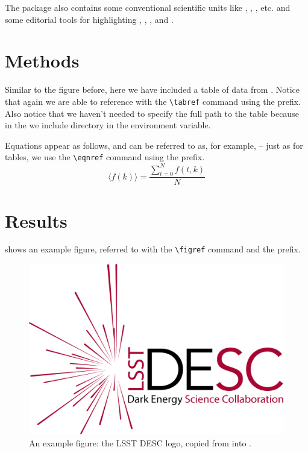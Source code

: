 \documentclass[\docopts]{\docclass}
\begin{document}
The  package also contains some conventional scientific units like \angstrom, \GeV, \Msun, etc. and some editorial tools for highlighting , , , and .



\section{Methods}
\label{sec:methods}

Similar to the figure before, here we have included a table of data from .
Notice that again we are able to reference  with the \verb=\tabref= command using the  prefix.
Also notice that we haven't needed to specify the full path to the table because in the  we include  directory in the  environment variable.



Equations appear as follows, and can be referred to as, for example,  -- just as for tables, we use the \verb=\eqnref= command using the  prefix.
\begin{equation}
  \label{eqn:example}
  \langle f(k) \rangle = \frac{ \sum_{t=0}^{N}f(t,k) }{N}
\end{equation}



\section{Results}
\label{sec:results}

 shows an example figure, referred to with the \verb=\figref= command and the  prefix.

\begin{figure}
\includegraphics[width=0.9\columnwidth]{example.png}
\caption{An example figure: the LSST DESC logo, copied from  into . \label{fig:example}}
\end{figure}
\end{document}
